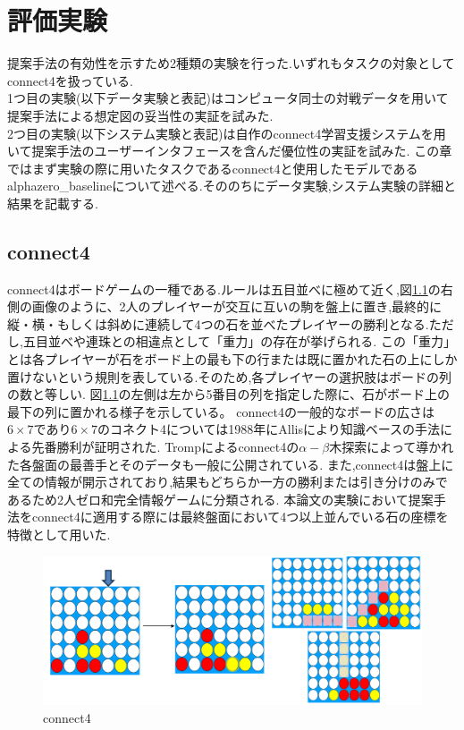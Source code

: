 \chapter{評価実験}
提案手法の有効性を示すため2種類の実験を行った.いずれもタスクの対象としてconnect4を扱っている.\\
1つ目の実験(以下データ実験と表記)はコンピュータ同士の対戦データを用いて提案手法による想定図の妥当性の実証を試みた.\\
2つ目の実験(以下システム実験と表記)は自作のconnect4学習支援システムを用いて提案手法のユーザーインタフェースを含んだ優位性の実証を試みた.
この章ではまず実験の際に用いたタスクであるconnect4と使用したモデルであるalphazero\_baselineについて述べる.そののちにデータ実験,システム実験の詳細と結果を記載する.
\section{connect4}
connect4\cite{connect4}はボードゲームの一種である.ルールは五目並べに極めて近く,図\ref{fig:connect4}の右側の画像のように、2人のプレイヤーが交互に互いの駒を盤上に置き,最終的に縦・横・もしくは斜めに連続して4つの石を並べたプレイヤーの勝利となる.ただし,五目並べや連珠との相違点として「重力」の存在が挙げられる.
この「重力」とは各プレイヤーが石をボード上の最も下の行または既に置かれた石の上にしか置けないという規則を表している.そのため,各プレイヤーの選択肢はボードの列の数と等しい.
図\ref{fig:connect4}の左側は左から5番目の列を指定した際に、石がボード上の最下の列に置かれる様子を示している。
connect4の一般的なボードの広さは$6\times7$であり$6\times7$のコネクト4については1988年にAllis\cite{allis}により知識ベースの手法による先番勝利が証明された.
Tromp\cite{data}によるconnect4の$\alpha-\beta$木探索によって導かれた各盤面の最善手とそのデータも一般に公開されている.
また,connect4は盤上に全ての情報が開示されており,結果もどちらか一方の勝利または引き分けのみであるため2人ゼロ和完全情報ゲーム\cite{gairon}に分類される.
本論文の実験において提案手法をconnect4に適用する際には最終盤面において4つ以上並んでいる石の座標を特徴として用いた.
\begin{figure}[t]
	\centering
    \includegraphics[width=\linewidth]{./figure/connect4.png}
	\caption{connect4}
	\label{fig:connect4}
\end{figure}
